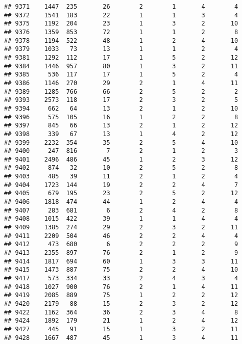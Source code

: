 \documentclass[]{article}
\begin{document}
\begin{verbatim}
## 9371    1447  235       26        2        1       4        4
## 9372    1541  183       22        1        1       3        4
## 9375    1192  204       23        1        3       2       10
## 9376    1359  853       72        1        1       2        8
## 9378    1194  522       48        1        2       4       10
## 9379    1033   73       13        1        1       2        4
## 9381    1292  112       17        1        5       2       12
## 9384    1446  957       80        1        3       2       11
## 9385     536  117       17        1        5       2        4
## 9386    1146  270       29        2        1       4       11
## 9389    1285  766       66        2        5       2        2
## 9393    2573  118       17        2        3       2        5
## 9394     662   64       13        2        1       2       10
## 9396     575  105       16        1        2       2        8
## 9397     845   66       13        2        1       2       12
## 9398     339   67       13        1        4       2       12
## 9399    2232  354       35        2        5       4       10
## 9400     247  816        7        2        1       2        3
## 9401    2496  486       45        1        2       3       12
## 9402     874   32       10        2        5       2        8
## 9403     485   39       11        2        1       2        4
## 9404    1723  144       19        2        2       4        7
## 9405     679  195       23        2        5       2       12
## 9406    1818  474       44        1        2       4        4
## 9407     283  681        6        2        4       2        8
## 9408    1015  422       39        1        1       4        4
## 9409    1385  274       29        2        3       2       11
## 9411    2209  504       46        2        2       4        4
## 9412     473  680        6        2        2       2        9
## 9413    2355  897       76        2        1       2        9
## 9414    1817  694       60        1        3       3       11
## 9415    1473  887       75        2        2       4       10
## 9417     573  334       33        2        4       3        4
## 9418    1027  900       76        2        1       4       11
## 9419    2085  889       75        1        2       2       12
## 9420    2179   88       15        2        3       2       12
## 9422    1162  364       36        2        3       4        8
## 9424    1892  179       21        1        2       4       12
## 9427     445   91       15        1        3       2       11
## 9428    1667  487       45        1        3       4       11

\end{verbatim}
\end{document}
